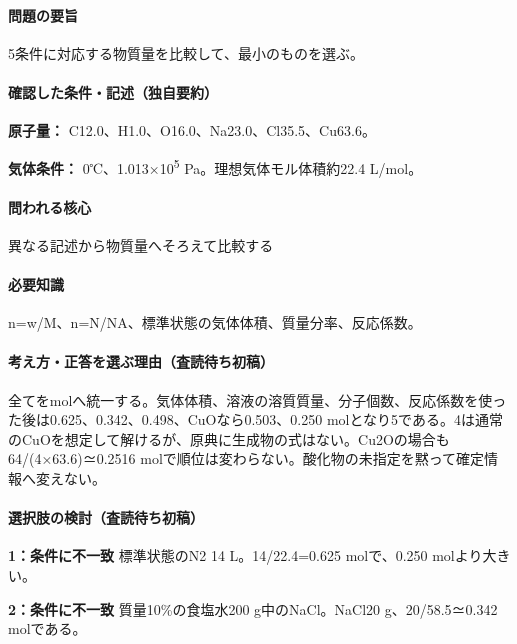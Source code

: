 \paragraph{問題の要旨} 5条件に対応する物質量を比較して、最小のものを選ぶ。

\paragraph{確認した条件・記述（独自要約）}\mbox{}\par

\noindent\textbf{原子量：} C12.0、H1.0、O16.0、Na23.0、Cl35.5、Cu63.6。\par

\noindent\textbf{気体条件：} 0℃、1.013×10\textsuperscript{5} Pa。理想気体モル体積約22.4 L/mol。\par

\paragraph{問われる核心} 異なる記述から物質量へそろえて比較する

\paragraph{必要知識} n=\allowbreak{}w/M、n=\allowbreak{}N/NA、標準状態の気体体積、質量分率、反応係数。

\paragraph{考え方・正答を選ぶ理由（査読待ち初稿）} 全てをmolへ統一する。気体体積、溶液の溶質質量、分子個数、反応係数を使った後は0.625、0.342、0.498、CuOなら0.503、0.250 molとなり5である。4は通常のCuOを想定して解けるが、原典に生成物の式はない。Cu2Oの場合も64/(4×63.6)≃0.2516 molで順位は変わらない。酸化物の未指定を黙って確定情報へ変えない。

\paragraph{選択肢の検討（査読待ち初稿）}\mbox{}\par

\noindent\textbf{1：条件に不一致} 標準状態のN2 14 L。14/22.4=\allowbreak{}0.625 molで、0.250 molより大きい。\par

\noindent\textbf{2：条件に不一致} 質量10\%の食塩水200 g中のNaCl。NaCl20 g、20/58.5≃0.342 molである。\par

